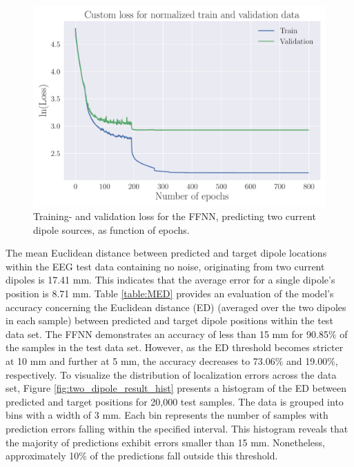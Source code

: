 \documentclass[a4paper, UKenglish, 11pt]{uiomaster}
\begin{document}
\begin{figure}[!htb]
    \centering
    \includegraphics[width=\linewidth]{figures/NN_two_dipole/Custom_Loss_simple_last_run_old_std_2_dipoles_32_0.001_0.35_0.1_0_800_(0).pdf}
    \caption{Training- and validation loss for the FFNN, predicting two current dipole sources, as function of epochs.}
    \label{fig:two_dipole_result_FFNN}
\end{figure}

\FloatBarrier

The mean Euclidean distance between predicted and target dipole locations within the EEG test data containing no noise, originating from two current dipoles is 17.41 mm. This indicates that the average error for a single dipole's position is 8.71 mm. Table \ref{table:MED} provides an evaluation of the model's accuracy concerning the Euclidean distance (ED) (averaged over the two dipoles in each sample) between predicted and target dipole positions within the test data set. The FFNN demonstrates an accuracy of less than 15 mm for 90.85$\%$ of the samples in the test data set. However, as the ED threshold becomes stricter at 10 mm and further at 5 mm, the accuracy decreases to 73.06$\%$ and 19.00$\%$, respectively. To visualize the distribution of localization errors across the data set, Figure \ref{fig:two_dipole_result_hist} presents a histogram of the ED between predicted and target positions for 20,000 test samples. The data is grouped into bins with a width of 3 mm. Each bin represents the number of samples with prediction errors falling within the specified interval. This histogram reveals that the majority of predictions exhibit errors smaller than 15 mm. Nonetheless, approximately 10$\%$ of the predictions fall outside this threshold.
\end{document}
